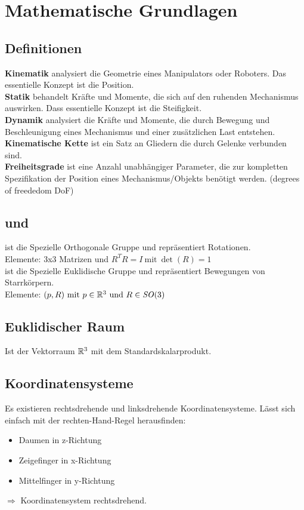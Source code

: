 

\section{Mathematische Grundlagen}

\subsection{Definitionen}
\textbf{Kinematik} analysiert die Geometrie eines Manipulators oder Roboters. Das essentielle Konzept ist die Position.\\
\textbf{Statik} behandelt Kräfte und Momente, die sich auf den ruhenden Mechanismus auswirken. Dass essentielle Konzept
ist die Steifigkeit.\\
\textbf{Dynamik} analysiert die Kräfte und Momente, die durch Bewegung und Beschleunigung eines Mechanismus und einer
zusätzlichen Last entstehen.\\
\textbf{Kinematische Kette} ist ein Satz an Gliedern die durch Gelenke verbunden sind.\\
\textbf{Freiheitsgrade} ist eine Anzahl unabhängiger Parameter, die zur kompletten Spezifikation der Position eines
Mechanismus/Objekts benötigt werden. (degrees of freededom DoF)

\subsection{\SO und \SE}
\SO ist die Spezielle Orthogonale Gruppe und repräsentiert Rotationen.\\
Elemente: 3x3 Matrizen und \(R^TR = I\ \text{mit}\ \det(R) = 1\)\\
\SE ist die Spezielle Euklidische Gruppe und repräsentiert Bewegungen von Starrkörpern.\\
Elemente: \((p, R)\ \text{mit}\ p \in \mathbb{R}^3\ \text{und}\ R \in \mathit{SO}(3)\)

\subsection{Euklidischer Raum}
Ist der Vektorraum \(\mathbb{R}^3\) mit dem Standardskalarprodukt.

\subsection{Koordinatensysteme}
Es existieren rechtsdrehende und linksdrehende Koordinatensysteme. Lässt sich einfach mit der rechten-Hand-Regel herausfinden:
\begin{itemize}
  \item Daumen in z-Richtung
  \item Zeigefinger in x-Richtung
  \item Mittelfinger in y-Richtung
\end{itemize}
\(\Rightarrow\) Koordinatensystem rechtsdrehend.\\

